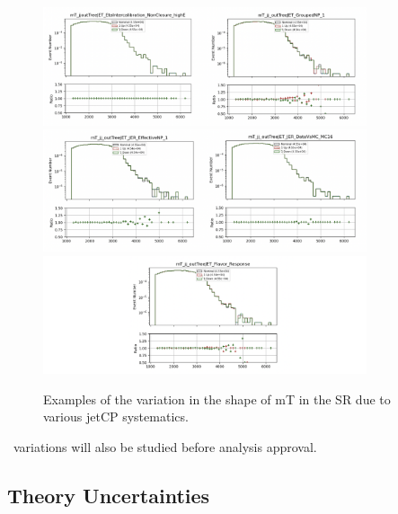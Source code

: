 \begin{figure}[!htbp]
\centering
   \includegraphics[width=0.85\textwidth]{figures/systs/jetCPshapes_1}
   \includegraphics[width=0.85\textwidth]{figures/systs/jetCPshapes_2}
   \includegraphics[width=0.85\textwidth]{figures/systs/jetCPshapes_3}
    \caption{Examples of the variation in the shape of mT in the SR due to various jetCP systematics.
    \label{fig:jetCPshapes}}
\end{figure}

\met~variations will also be studied before analysis approval.

\subsection{Theory Uncertainties}

